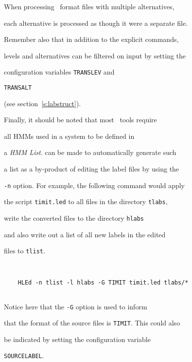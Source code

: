 When processing \HTK\ format files with multiple alternatives,


each alternative is processed as though it were a separate file.





Remember also that in addition to the explicit  commands,


levels and alternatives can be filtered on input by setting the


configuration variables \texttt{TRANSLEV} and 


\texttt{TRANSALT} 


(see section~\ref{s:labstruct}).





Finally, it should be noted that most \HTK\ tools require 


all HMMs used in a system to be defined in


a {\it HMM List}.   can be made to automatically generate such


a list as a by-product of editing the label files by using the 


\texttt{-n} option.  For example, the following command would apply


the script \texttt{timit.led} to all files in the directory \texttt{tlabs},


write the converted files to the directory \texttt{hlabs}


and also write out a list of all new labels in the edited


files to \texttt{tlist}.


\begin{verbatim}


    HLEd -n tlist -l hlabs -G TIMIT timit.led tlabs/*


\end{verbatim}


Notice here that the \texttt{-G} option is used to inform  


that the format of the source files is \texttt{TIMIT}. This could also


be indicated by setting the configuration variable 


\texttt{SOURCELABEL}.





